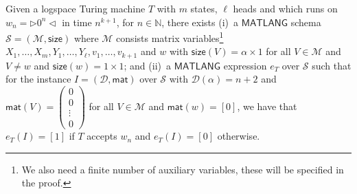 \begin{proposition}
Given a logspace Turing machine $T$ with $m$ states, $\ell$ heads and which runs on $w_n=\rhd 0^n \lhd$ in time $n^{k+1}$, for $n\in\mathbb{N}$, there exists (i)~a $\mathsf{MATLANG}$ 
schema $\mathcal{S}=(\mathcal{M},\textsf{size})$ where $\mathcal{M}$ consists matrix variables\footnote{We also need a finite number of auxiliary variables, these will be specified in the proof.} $X_1,\ldots,X_m,Y_1,\ldots,Y_\ell, v_1,\ldots,v_{k+1}$ and $w$ with
$\mathsf{size}(V)=\alpha\times 1$ for all $V\in\mathcal{M}$ and $V\neq w$ and $\mathsf{size}(w)=1\times 1$; and (ii)~a $\mathsf{MATLANG}$ expression $e_T$ over $\mathcal{S}$ such that for the instance $I=(\mathcal{D},\textsf{mat})$ over $\mathcal{S}$ with $\mathcal{D}(\alpha)=n+2$ and $\mathsf{mat}(V)=\left(\begin{smallmatrix}0\\
0\\\vdots\\0\end{smallmatrix}\right)$ for all $V\in\mathcal{M}$ and
$\mathsf{mat}(w)=[0]$, we have that 
$e_T(I)=[1]$ if $T$ accepts $w_n$ and  $e_T(I)=[0]$ otherwise.
\end{proposition}
